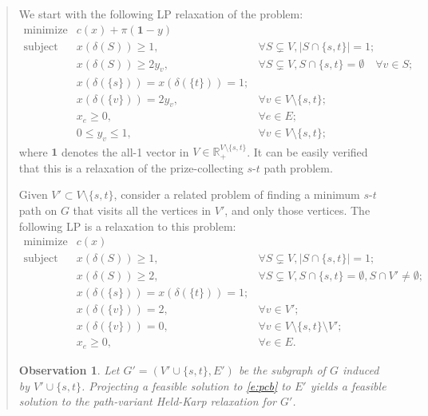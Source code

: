 \documentclass[11pt,letterpaper]{article}
\newtheorem{obs}{Observation}
\newcommand{\st}{\mbox{$s$-$t$} }
\begin{document}
\begin{quote}
We start with the following LP relaxation of the problem:\begin{equation}\label{e:pca}
\begin{array}{lll}
\textrm{minimize}&c(x)+\pi(\mathbf{1}-y)&\\
\textrm{subject to}&x(\delta(S))\geq 1,&\forall S\subsetneq V, |S\cap\{s,t\}|=1;\\
&x(\delta(S))\geq 2y_v,&\forall S\subsetneq V, S\cap\{s,t\}=\emptyset\quad \forall v\in S;\\
&x(\delta(\{s\})) = x(\delta(\{t\})) = 1;&\\
&x(\delta(\{v\})) = 2y_v,&\forall v\in V\setminus\{s,t\};\\
&x_e\geq 0,&\forall e\in E;\\
&0\leq y_v\leq 1,&\forall v\in V\setminus\{s,t\};
\end{array}
\end{equation}where $\mathbf{1}$ denotes the all-1 vector in $V\in\mathbb{R}_+^{V\setminus\{s,t\}}$. It can be easily verified that this is a relaxation of the prize-collecting \st path problem.

Given $V'\subset V\setminus\{s,t\}$, consider a related problem of finding a minimum \st path on $G$ that visits all the vertices in $V'$, and only those vertices. The following LP is a relaxation to this problem:\begin{equation}\label{e:pcb}
\begin{array}{lll}
\textrm{minimize}&c(x)&\\
\textrm{subject to}&x(\delta(S))\geq 1,&\forall S\subsetneq V, |S\cap\{s,t\}|=1;\\
&x(\delta(S))\geq 2,&\forall S\subsetneq V, S\cap\{s,t\}=\emptyset, S\cap V'\neq\emptyset;\\
&x(\delta(\{s\})) = x(\delta(\{t\})) = 1;&\\
&x(\delta(\{v\})) = 2,&\forall v\in V';\\
&x(\delta(\{v\})) = 0,&\forall v\in V\setminus\{s,t\}\setminus V';\\
&x_e\geq 0,&\forall e\in E.
\end{array}
\end{equation}

\begin{obs}\label{o:pchk}
Let $G'=(V'\cup\{s,t\},E')$ be the subgraph of $G$ induced by $V'\cup\{s,t\}$. Projecting a feasible solution to \eqref{e:pcb} to $E'$ yields a feasible solution to the path-variant Held-Karp relaxation for $G'$.
\end{obs}


\end{quote}
\end{document}
